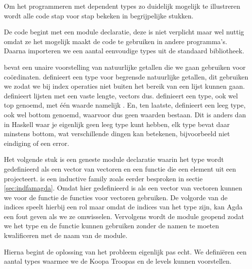 Om het programmeren met dependent types zo duidelijk mogelijk te illustreren
wordt alle code stap voor stap bekeken in begrijpelijke stukken.  

De code begint met een module declaratie, deze is niet verplicht maar wel
nuttig omdat ze het mogelijk maakt de code te gebruiken in andere programma's.
Daarna importeren we een aantal eenvoudige types uit de standaard bibliotheek.


 bevat een unaire voorstelling van natuurlijke getallen die we
gaan gebruiken voor coördinaten.  definieert een type voor
begrensde natuurlijke getallen, dit gebruiken we zodat we bij index operaties
niet buiten het bereik van een lijst kunnen gaan.  definieert
lijsten met een vaste lengte, vectors dus.  definieert een
type,  ook wel top genoemd, met één waarde namelijk . En,
ten laatste,  definieert een leeg type,  ook wel
bottom genoemd, waarvoor dus geen waarden bestaan. Dit is anders dan in Haskell
waar je eigenlijk geen leeg type kunt hebben, elk type bevat daar minstens
bottom, wat verschillende dingen kan betekenen, bijvoorbeeld niet eindiging of
een error.

Het volgende stuk is een geneste module declaratie waarin het type
 wordt gedefinieerd als een vector van vectoren en een functie
die een element uit een  projecteert.  is een
inductive family zoals eerder besproken in sectie \ref{sec:indfamagda}. Omdat
 hier gedefinieerd is als een vector van vectoren kunnen we voor
de  functie de  functies voor vectoren gebruiken.
De volgorde van de indices speelt hierbij een rol maar omdat de indices van het
type  zijn, kan Agda een fout geven als we ze omwisselen.
Vervolgens wordt de module geopend zodat we het type en de functie kunnen
gebruiken zonder de namen te moeten kwalificeren met de naam van de module.


Hierna begint de oplossing van het probleem eigenlijk pas echt. We definiëren
een aantal types waarmee we de Koopa Troopas en de levels kunnen voorstellen.


